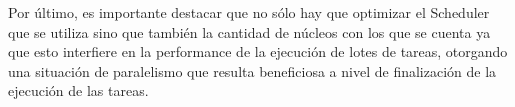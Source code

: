 \documentclass[a4paper]{article}
\begin{document}
Por \'ultimo, es importante destacar que no s\'olo hay que optimizar el Scheduler que se utiliza sino que tambi\'en la cantidad de n\'ucleos con los que se cuenta ya que esto interfiere en la performance de la ejecuci\'on de lotes de tareas, otorgando una situaci\'on de paralelismo que resulta beneficiosa a nivel de finalizaci\'on de la ejecuci\'on de las tareas. 
\end{document}
